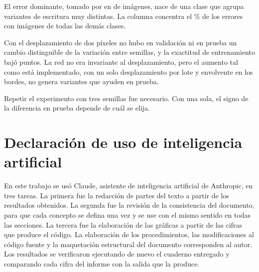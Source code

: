 \documentclass[11pt,letterpaper]{article}
\begin{document}
El error dominante, \parReal{} tomado por \parPred{} en \parN{} de \parTotal{} imágenes, nace de una clase que agrupa variantes de escritura muy distintas. La columna \colMax{} concentra el \colMaxPct{} \% de los errores con imágenes de todas las demás clases.

Con el desplazamiento de dos píxeles no hubo en validación ni en prueba un cambio distinguible de la variación entre semillas, y la exactitud de entrenamiento bajó \augDifTrAbs{} puntos. La red no era invariante al desplazamiento, pero el aumento tal como está implementado, con un solo desplazamiento por lote y envolvente en los bordes, no genera variantes que ayuden en prueba.

Repetir el experimento con tres semillas fue necesario. Con una sola, el signo de la diferencia en prueba depende de cuál se elija.

\section{Declaración de uso de inteligencia artificial}

En este trabajo se usó Claude, asistente de inteligencia artificial de Anthropic, en tres tareas. La primera fue la redacción de partes del texto a partir de los resultados obtenidos. La segunda fue la revisión de la consistencia del documento, para que cada concepto se defina una vez y se use con el mismo sentido en todas las secciones. La tercera fue la elaboración de las gráficas a partir de las cifras que produce el código. La elaboración de los procedimientos, las modificaciones al código fuente y la maquetación estructural del documento corresponden al autor. Los resultados se verificaron ejecutando de nuevo el cuaderno entregado y comparando cada cifra del informe con la salida que la produce.
\end{document}
